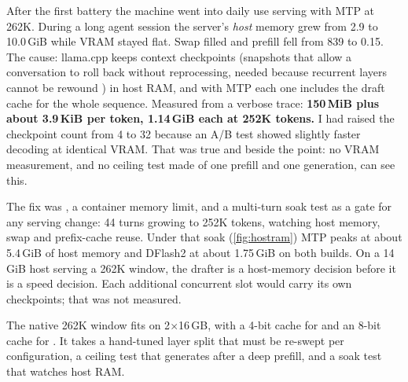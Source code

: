 After the first battery the machine went into daily use serving \Qsix{} with MTP at 262K. During a
long agent session the server's \emph{host} memory grew from 2.9 to 10.0\,GiB while VRAM stayed flat.
Swap filled and prefill fell from 839 to 0.15\tps. The cause: llama.cpp keeps context checkpoints
(snapshots that allow a conversation to roll back without reprocessing, needed because recurrent
layers cannot be rewound \citep{llamacpp_pr20288_checkpoints}) in host RAM, and with MTP each one
includes the draft cache for the whole sequence. Measured from a verbose trace: \textbf{150\,MiB plus
about 3.9\,KiB per token, 1.14\,GiB each at 252K tokens.} I had raised the checkpoint count from 4 to
32 because an A/B test showed slightly faster decoding at identical VRAM. That was true and beside the
point: no VRAM measurement, and no ceiling test made of one prefill and one generation, can see this.

The fix was , a container memory limit, and a multi-turn soak test as a gate for any
serving change: 44 turns growing to 252K tokens, watching host memory, swap and prefix-cache reuse.
Under that soak (\cref{fig:hostram}) MTP peaks at about 5.4\,GiB of host memory and DFlash2 at about
1.75\,GiB on both builds. On a 14\,GiB host serving a 262K window, the drafter is a host-memory
decision before it is a speed decision. Each additional concurrent slot would carry its own
checkpoints; that was not measured.

\begin{takeaway}
The native 262K window fits on 2$\times$16\,GB, with a 4-bit cache for \Qsix{} and an 8-bit cache for
\Qfour. It takes a hand-tuned layer split that must be re-swept per configuration, a ceiling test that
generates after a deep prefill, and a soak test that watches host RAM.
\end{takeaway}
